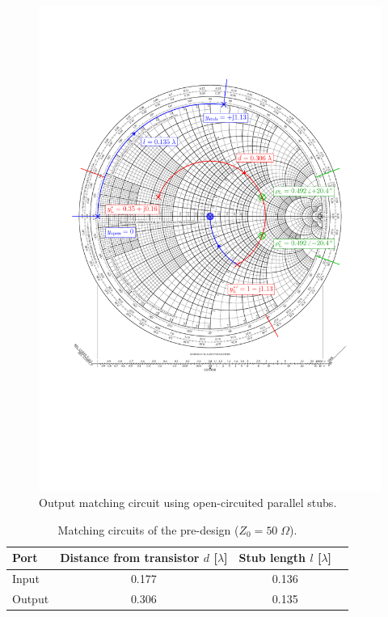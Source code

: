 \documentclass[a4paper, 12pt]{article}
\newlength{\oneLine}
\begin{document}
\begin{figure}[!h]
	\begin{center}
		\includegraphics[width=\textwidth]{img/loadSmith.pdf}
		\caption{Output matching circuit using open-circuited parallel stubs.}
		\label{f:Rl}
	\end{center}
\end{figure}

\begin{table}[!h]
	\begin{center}
		\caption{Matching circuits of the pre-design ($Z_0 = 50\;\Omega$).}
		\label{t:m2}
		\renewcommand{\arraystretch}{1.2}
		\begin{tabular}{lccc}
			Port		&	Distance from transistor $d$ [$\lambda$]	& Stub length $l$ [$\lambda$]	\\
			\hline
			Input		&	0.177				& 0.136				\\
			Output		&	0.306				& 0.135			
		\end{tabular}
	\end{center}
	\vspace{-\oneLine}
\end{table}
\end{document}
